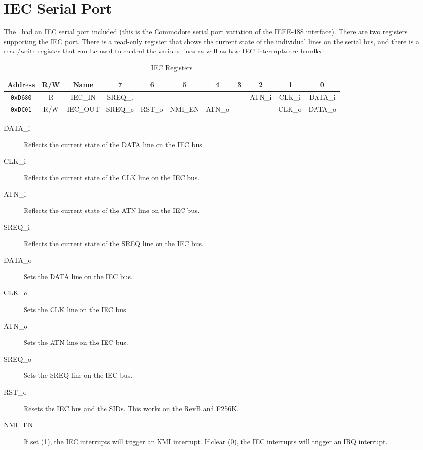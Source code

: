 \chapter{IEC Serial Port}

The \jr\ had an IEC serial port included (this is the Commodore serial port variation of the IEEE-488 interface). There are two registers supporting the IEC port. There is a read-only register that shows the current state of the individual lines on the serial bus, and there is a read/write register that can be used to control the various lines as well as how IEC interrupts are handled.

\begin{table}[h]
    \begin{center}
        \begin{tabular}{|c|c|c|c|c|c|c|c|c|c|c|} \hline
            Address & R/W & Name & 7 & 6 & 5 & 4 & 3 & 2 & 1 & 0 \\\hline\hline
            \verb+0xD680+ & R & IEC\_IN & SREQ\_i & \multicolumn{4}{|c|}{---} & ATN\_i & CLK\_i & DATA\_i \\ \hline
            \verb+0xDC01+ & R/W & IEC\_OUT & SREQ\_o & RST\_o & NMI\_EN & ATN\_o & --- & --- & CLK\_o & DATA\_o \\ \hline
        \end{tabular}
    \end{center}
    \caption{IEC Registers}
    \label{tab:iec_reg}
\end{table}

\begin{description}
    \item[DATA\_i] Reflects the current state of the DATA line on the IEC bus. 
    \item[CLK\_i] Reflects the current state of the CLK line on the IEC bus.
    \item[ATN\_i] Reflects the current state of the ATN line on the IEC bus.
    \item[SREQ\_i] Reflects the current state of the SREQ line on the IEC bus.
    
    \item[DATA\_o] Sets the DATA line on the IEC bus. 
    \item[CLK\_o] Sets the CLK line on the IEC bus.
    \item[ATN\_o] Sets the ATN line on the IEC bus.
    \item[SREQ\_o] Sets the SREQ line on the IEC bus.
    \item[RST\_o] Resets the IEC bus and the SIDs. This works on the RevB and F256K. 
    \item[NMI\_EN] If set (1), the IEC interrupts will trigger an NMI interrupt. If clear (0), the IEC interrupts will trigger an IRQ interrupt.  
\end{description}
